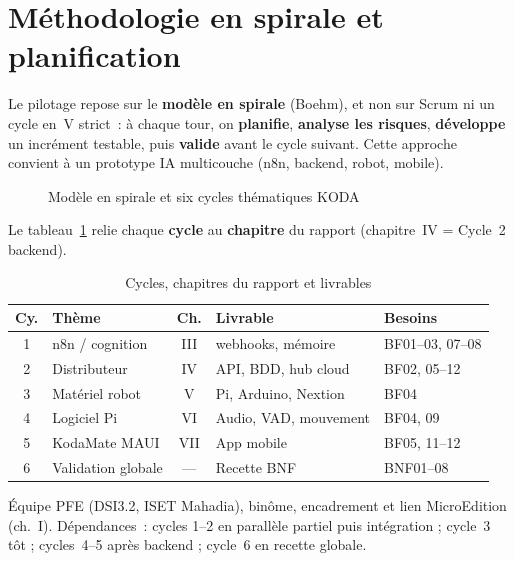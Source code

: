 \documentclass[a4paper,12pt]{report}
\begin{document}
	\section{Méthodologie en spirale et planification}
	
	Le pilotage repose sur le \textbf{modèle en spirale} (Boehm), et non sur Scrum ni un
	cycle en~V strict~: à chaque tour, on \textbf{planifie}, \textbf{analyse les risques},
	\textbf{développe} un incrément testable, puis \textbf{valide} avant le cycle suivant.
	Cette approche convient à un prototype IA multicouche (n8n, backend, robot, mobile).
	
	\begin{figure}[htbp]
		\centering
		\caption{Modèle en spirale et six cycles thématiques KODA}
		\label{fig:ch2-modele-spirale}
	\end{figure}
	
	Le tableau~\ref{tab:cycles_koda} relie chaque \textbf{cycle} au \textbf{chapitre}
	du rapport (chapitre~IV = Cycle~2 backend).
	
	\begin{table}[htbp]
		\centering
		\caption{Cycles, chapitres du rapport et livrables}
		\label{tab:cycles_koda}
		\small
		\renewcommand{\arraystretch}{1.2}
		\begin{tabularx}{\textwidth}{|c|>{\raggedright\arraybackslash}p{2.8cm}|c|>{\raggedright\arraybackslash}X|>{\raggedright\arraybackslash}p{2.4cm}|}
			\hline
			\textbf{Cy.} & \textbf{Thème} & \textbf{Ch.} & \textbf{Livrable} & \textbf{Besoins} \\
			\hline
			1 & n8n / cognition & III & 3 webhooks, mémoire & BF01--03, 07--08 \\
			\hline
			2 & Distributeur & IV & API, BDD, hub cloud & BF02, 05--12 \\
			\hline
			3 & Matériel robot & V & Pi, Arduino, Nextion & BF04 \\
			\hline
			4 & Logiciel Pi & VI & Audio, VAD, mouvement & BF04, 09 \\
			\hline
			5 & KodaMate MAUI & VII & App mobile & BF05, 11--12 \\
			\hline
			6 & Validation globale & --- & Recette BNF & BNF01--08 \\
			\hline
		\end{tabularx}
	\end{table}
	
	Équipe PFE (DSI3.2, ISET Mahadia), binôme, encadrement et lien MicroEdition (ch.~I).
	Dépendances~: cycles 1--2 en parallèle partiel puis intégration ; cycle~3 tôt ;
	cycles~4--5 après backend ; cycle~6 en recette globale.
	
\end{document}
